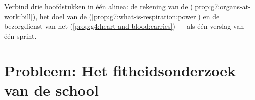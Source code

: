 \begin{exercise}[$\star\star\star$]\label{exo:g7:organs-at-work:12}
Verbind drie hoofdstukken in één alinea: de rekening van de 
(\cref{prop:g7:organs-at-work:bill}), het doel van de 
(\cref{prop:g7:what-is-respiration:power}) en de bezorgdienst van het
 (\cref{prop:g4:heart-and-blood:carries}) --- als één verslag van
één sprint.
\end{exercise}

\section{Probleem: Het fitheidsonderzoek van de school}

